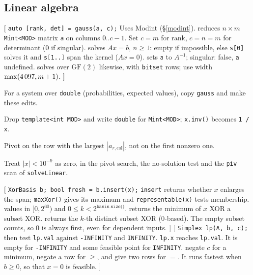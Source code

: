 \subsection{Linear algebra}
[
	 \texttt{auto [rank, det] = gauss(a, c);} Uses Modint (\S\ref{modint}).
	 reduces $n \times m$ \texttt{Mint<MOD>} matrix \texttt{a} on columns $0..c-1$. Set $c = m$ for rank, $c = n = m$ for determinant (0 if singular).
	 solves $Ax = b$, $n \ge 1$: empty if impossible, else \texttt{s[0]} solves it and \texttt{s[1..]} span the kernel ($Ax = 0$).
	 sets \texttt{a} to $A^{-1}$; singular: false, \texttt{a} undefined.
	 solves over $\mathrm{GF}(2)$ likewise, with \texttt{bitset} rows; use width $\max(4\,097, m + 1)$.
]\label{gauss}
{\footnotesize\tightdisplay
{}
For a system over \texttt{double} (probabilities, expected values), copy \texttt{gauss} and make these edits.
\begin{facts}
	\item Drop \texttt{template<int MOD>} and write \texttt{double} for \texttt{Mint<MOD>}; \texttt{x.inv()} becomes \texttt{1 / x}.
	\item Pivot on the row with the largest $|a_{r,\mathrm{col}}|$, not on the first nonzero one.
	\item Treat $|x| < 10^{-9}$ as zero, in the pivot search, the no-solution test and the \texttt{piv} scan of \texttt{solveLinear}.
\end{facts}
}
[
	 \texttt{XorBasis b; bool fresh = b.insert(x);}
	 \texttt{insert} returns whether $x$ enlarges the span; \texttt{maxXor()} gives its maximum and \texttt{representable(x)} tests membership.
	 values in ${[0, 2^{60})}$ and $0 \le k < 2^{\texttt{basis.size()}}$.
	 returns the minimum of $x$ XOR a subset XOR.
	 returns the $k$-th distinct subset XOR (0-based). The empty subset counts, so 0 is always first, even for dependent inputs.
]\label{xorbasis}
[
	 \texttt{Simplex lp(A, b, c);} then test \texttt{lp.val} against \texttt{-INFINITY} and \texttt{INFINITY}.
	 \texttt{lp.x} reaches \texttt{lp.val}. It is empty for \texttt{-INFINITY} and some feasible point for \texttt{INFINITY}.
	 negate $c$ for a minimum, negate a row for $\ge$, and give two rows for $=$.
	It runs fastest when $b \ge 0$, so that $x = 0$ is feasible.
]\label{simplex}

